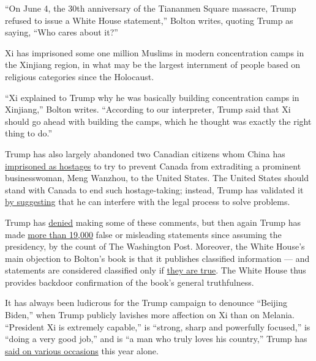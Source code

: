 ``On June 4, the 30th anniversary of the Tiananmen Square massacre,
Trump refused to issue a White House statement,'' Bolton writes, quoting
Trump as saying, ``Who cares about it?''

Xi has imprisoned some one million Muslims in modern concentration camps
in the Xinjiang region, in what may be the largest internment of people
based on religious categories since the Holocaust.

``Xi explained to Trump why he was basically building concentration
camps in Xinjiang,'' Bolton writes. ``According to our interpreter,
Trump said that Xi should go ahead with building the camps, which he
thought was exactly the right thing to do.''

Trump has also largely abandoned two Canadian citizens whom China has
\href{https://www.nytimes3xbfgragh.onion/2020/06/19/world/asia/china-canada-kovrig-spavor.html}{imprisoned
as hostages} to try to prevent Canada from extraditing a prominent
businesswoman, Meng Wanzhou, to the United States. The United States
should stand with Canada to end such hostage-taking; instead, Trump has
validated it \href{https://www.bbc.com/news/world-us-canada-46533971}{by
suggesting} that he can interfere with the legal process to solve
problems.

Trump has
\href{https://www.wsj.com/articles/transcript-of-president-trumps-interview-with-the-wall-street-journal-11592501000}{denied}
making some of these comments, but then again Trump has made
\href{https://www.washingtonpost.com/graphics/politics/trump-claims-database/?itid=lk_inline_manual_3\&itid=lk_inline_manual_3}{more
than 19,000} false or misleading statements since assuming the
presidency, by the count of The Washington Post. Moreover, the White
House's main objection to Bolton's book is that it publishes classified
information --- and statements are considered classified only if
\href{https://www.businessinsider.com/trumps-claim-bolton-is-lying-contradicts-claim-book-is-classified-2020-6}{they
are true}. The White House thus provides backdoor confirmation of the
book's general truthfulness.

It has always been ludicrous for the Trump campaign to denounce
``Beijing Biden,'' when Trump publicly lavishes more affection on Xi
than on Melania. ``President Xi is extremely capable,'' is ``strong,
sharp and powerfully focused,'' is ``doing a very good job,'' and is ``a
man who truly loves his country,'' Trump has
\href{https://www.politico.com/news/2020/04/15/trump-china-coronavirus-188736}{said
on various occasions} this year alone.


